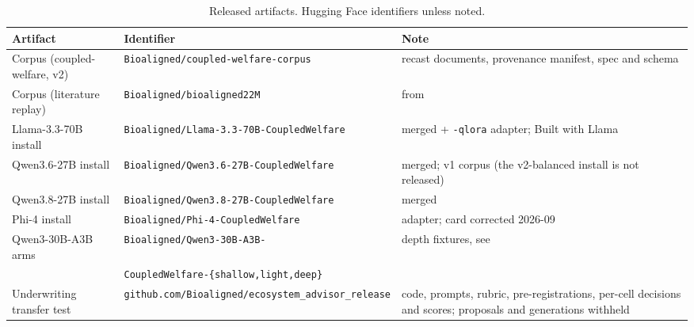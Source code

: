 \documentclass[11pt]{article}
\begin{document}
\begin{table}[h]
\centering
\caption{Released artifacts. Hugging Face identifiers unless noted.}
\label{tab:artifacts}\scriptsize
\begin{tabular}{@{}llp{4.1cm}@{}}
\toprule
Artifact & Identifier & Note \\
\midrule
Corpus (coupled-welfare, v2) & \texttt{Bioaligned/coupled-welfare-corpus} & recast documents, provenance manifest, spec and schema \\
Corpus (literature replay) & \texttt{Bioaligned/bioaligned22M} & from \citet{northen2026bioalignment} \\
Llama-3.3-70B install & \texttt{Bioaligned/Llama-3.3-70B-CoupledWelfare} & merged + \texttt{-qlora} adapter; Built with Llama \\
Qwen3.6-27B install & \texttt{Bioaligned/Qwen3.6-27B-CoupledWelfare} & merged; v1 corpus (the v2-balanced install is not released) \\
Qwen3.8-27B install & \texttt{Bioaligned/Qwen3.8-27B-CoupledWelfare} & merged \\
Phi-4 install & \texttt{Bioaligned/Phi-4-CoupledWelfare} & adapter; card corrected 2026-09 \\
Qwen3-30B-A3B arms & \texttt{Bioaligned/Qwen3-30B-A3B-} & depth fixtures, see \citep{northen2026depth} \\
 & \quad\texttt{CoupledWelfare-\{shallow,light,deep\}} & \\
Underwriting transfer test & \texttt{github.com/Bioaligned/ecosystem\_advisor\_release} & code, prompts, rubric, pre-registrations, per-cell decisions and scores; proposals and generations withheld \\
\bottomrule
\end{tabular}
\end{table}
\end{document}
